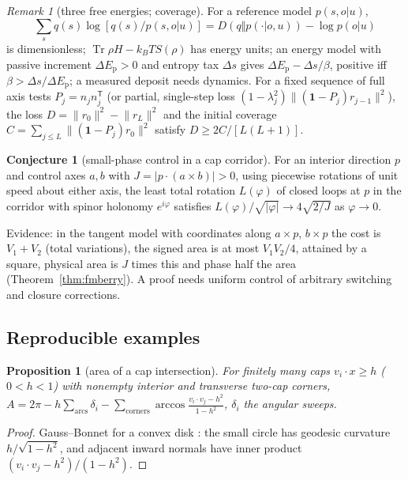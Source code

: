 \documentclass[aps,pra,onecolumn,superscriptaddress,nofootinbib,10pt]{revtex4-2}
\newtheorem{proposition}[theorem]{Proposition}
\theoremstyle{definition}
\newtheorem{conjecture}[theorem]{Conjecture}
\theoremstyle{remark}
\newtheorem{remark}[theorem]{Remark}
\newcommand{\tr}{\operatorname{Tr}}
\begin{document}
\begin{remark}[three free energies; coverage]\label{rem:fmenergies}
For a reference model $p(s,o|u)$,
\[
\textstyle\sum_sq(s)\log[q(s)/p(s,o|u)]=D(q\Vert p(\cdot|o,u))-\log p(o|u)
\]
is dimensionless; $\tr\rho H-k_BTS(\rho)$ has energy units; an energy model with passive increment $\Delta E_{\mathrm p}>0$ and entropy tax $\Delta s$ gives $\Delta E_{\mathrm p}-\Delta s/\beta$, positive iff $\beta>\Delta s/\Delta E_{\mathrm p}$; a
measured deposit needs dynamics.  For a fixed sequence of full axis tests $P_j=n_jn_j^{\mathsf T}$ (or partial, single-step loss
$(1-\lambda_j^2)\lVert(\mathbf1-P_j)r_{j-1}\rVert^2$), the loss $D=\lVert r_0\rVert^2-\lVert r_L\rVert^2$ and the initial coverage $C=\sum_{j\le L}\lVert(\mathbf1-P_j)r_0\rVert^2$ satisfy $D\ge2C/[L(L+1)]$.
\end{remark}

\begin{conjecture}[small-phase control in a cap corridor]\label{conj:fmcontrol}
For an interior direction $p$ and control axes $a,b$ with $J=\lvert p\cdot(a\times b)\rvert>0$, using piecewise rotations of unit speed
about either axis, the least total rotation $L(\varphi)$ of closed loops at $p$ in the corridor with spinor holonomy
$e^{i\varphi}$ satisfies $L(\varphi)/\sqrt{\lvert\varphi\rvert}\to4\sqrt{2/J}$ as $\varphi\to0$.
\end{conjecture}
\noindent Evidence: in the tangent model with coordinates along $a\times p$, $b\times p$ the cost is $V_1+V_2$ (total variations),
the signed area is at most $V_1V_2/4$, attained by a square, physical area is $J$ times this and phase half the
area (Theorem~\ref{thm:fmberry}).  A proof needs uniform control of arbitrary switching and closure corrections.

\subsection{Reproducible examples}\label{sec:fmexamples}

\begin{proposition}[area of a cap intersection]\label{prop:fmarea}
For finitely many caps $v_i\cdot x\ge h$ ($0<h<1$) with nonempty interior and transverse two-cap corners,
$A=2\pi-h\sum_{\mathrm{arcs}}\delta_i-\sum_{\mathrm{corners}}\arccos\frac{v_i\cdot v_j-h^2}{1-h^2}$, $\delta_i$ the angular sweeps.
\end{proposition}
\begin{proof}
Gauss--Bonnet for a convex disk \cite[Ch.~4, \S5]{n2-docarmo}: the small circle has geodesic curvature $h/\sqrt{1-h^2}$, and adjacent
inward normals have inner product $(v_i\cdot v_j-h^2)/(1-h^2)$.
\end{proof}
\end{document}
